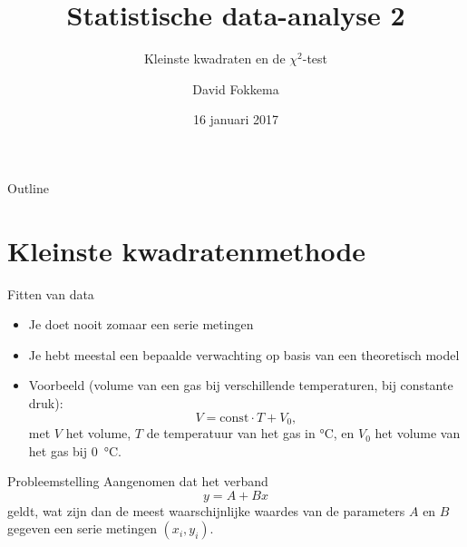 \documentclass{beamer}
\title{Statistische data-analyse 2}
\subtitle{Kleinste kwadraten en de $\chi^2$-test}
\author{David Fokkema}
\institute{
  Practicum natuurkunde \\
  Vrije Universiteit / Universiteit van Amsterdam
}
\date{16 januari 2017}
\begin{document}
\begin{frame}
  \titlepage
\end{frame}

\begin{frame}{Outline}
  \tableofcontents
\end{frame}




\section{Kleinste kwadratenmethode}

\begin{frame}{Fitten van data}
  \begin{itemize}
    \item Je doet nooit zomaar een serie metingen
    \item Je hebt meestal een bepaalde verwachting op basis van een theoretisch model
    \pause
    \item Voorbeeld (volume van een gas bij verschillende temperaturen, bij constante druk):
    \begin{equation*}
      V = \mathrm{const}\cdot T + V_0,
    \end{equation*}
    met $V$ het volume, $T$ de temperatuur van het gas in \si{\celsius}, en $V_0$ het volume van het gas bij \SI{0}{\celsius}.
  \end{itemize}
\end{frame}

\begin{frame}{Probleemstelling}
  Aangenomen dat het verband
  \begin{equation*}
    y = A + Bx
  \end{equation*}
  geldt, wat zijn dan de meest waarschijnlijke waardes van de parameters $A$ en $B$ gegeven een serie metingen $(x_i, y_i)$.
\end{frame}
\end{document}
